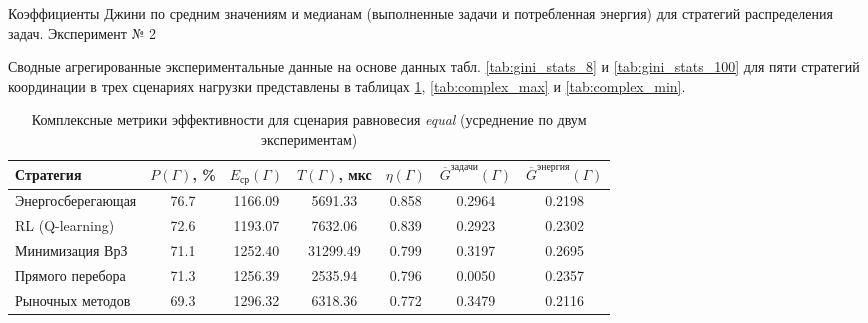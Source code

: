 \begin{table}[htbp]
	\centering
	\caption{Коэффициенты Джини по средним значениям и медианам (выполненные задачи и потребленная энергия) для стратегий распределения задач. Эксперимент № 2}
	\label{tab:gini_stats_100}
\end{table}

Сводные агрегированные экспериментальные данные на основе данных табл. \ref{tab:gini_stats_8} и \ref{tab:gini_stats_100} для пяти стратегий координации в трех сценариях нагрузки представлены в таблицах \ref{tab:complex_equal}, \ref{tab:complex_max} и \ref{tab:complex_min}.

\begin{table}[h!]
	\centering
	\caption{Комплексные метрики эффективности для сценария равновесия \textit{equal} (усреднение по двум экспериментам)}
	\label{tab:complex_equal}
	\small
	\begin{tabular}{|l|c|c|c|c|c|c|}
		\hline
		\textbf{Стратегия} & $P(\Gamma)$, \% & $E_{\text{ср}}(\Gamma)$ & $T(\Gamma)$, мкс & $\eta(\Gamma)$ & $\overline{G}^{\text{задачи}}(\Gamma)$ & $\overline{G}^{\text{энергия}}(\Gamma)$ \\ \hline
		Энергосберегающая & 76.7 & 1166.09 &  5691.33 & 0.858 & 0.2964 & 0.2198 \\ \hline
		RL (Q-learning)    & 72.6 & 1193.07 &  7632.06 & 0.839 & 0.2923 & 0.2302 \\ \hline
		Минимизация ВрЗ    & 71.1 & 1252.40 & 31299.49 & 0.799 & 0.3197 & 0.2695 \\ \hline
		Прямого перебора   & 71.3 & 1256.39 &  2535.94 & 0.796 & 0.0050 & 0.2357 \\ \hline
		Рыночных методов   & 69.3 & 1296.32 &  6318.36 & 0.772 & 0.3479 & 0.2116 \\ \hline
	\end{tabular}
\end{table}

